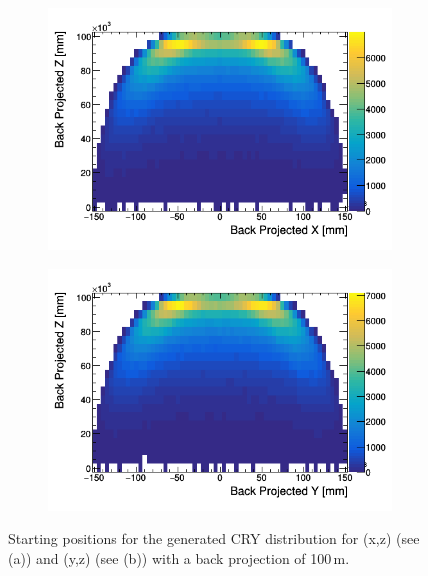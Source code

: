 \begin{figure}[!h]
\centering
\begin{subfigure}{.5\textwidth}
  \centering
  \includegraphics[width=\linewidth]{Chapter4/Figs/Raster/CryPlots/BackProjectionXZ.png}
  \captionsetup{width=.9\linewidth}
  \caption{}
  \label{subFig:BackProjectionXZ}
\end{subfigure}%
\begin{subfigure}{.5\textwidth}
  \centering
  \includegraphics[width=\linewidth]{Chapter4/Figs/Raster/CryPlots/BackProjectionYZ.png}
  \captionsetup{width=.9\linewidth}
  \caption{}
  \label{subFig:BackProjectionYZ}
\end{subfigure}
\caption{Starting positions for the generated CRY distribution for (x,z) (see (a)) and (y,z) (see (b)) with a back projection of 100\,m.}
\label{fig:BackProjection_XZ_YZ}
\end{figure}

